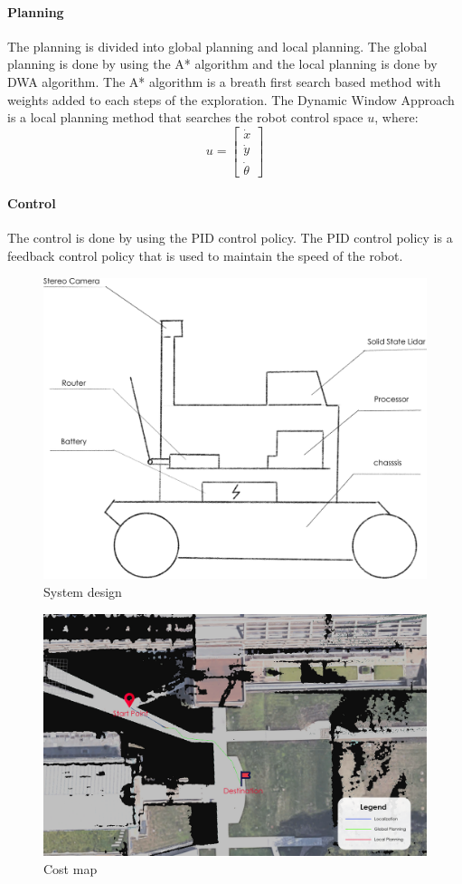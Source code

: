 \documentclass[balance,upint,subscriptcorrection,varvw,nofoot, mathalfa=cal=boondoxo,spanish,french,vietnamese,russian,greek,pdf-a,fontspec,colorlinks]{asmeconf}
\begin{document}
\paragraph{Planning} The planning is divided into global planning and local planning. The global planning is done by using the A* algorithm and the local planning is done by DWA algorithm. The A* algorithm is a breath first search based method with weights added to each steps of the exploration. The Dynamic Window Approach is a local planning method that searches the robot control space $u$, where:
\begin{equation}
	u=\left[\begin{array}{c}\dot{x}\\\dot{y}\\\dot{\theta}\end{array}\right]
\end{equation}
\paragraph{Control} The control is done by using the PID control policy. The PID control policy is a feedback control policy that is used to maintain the speed of the robot.


\begin{figure}
\centering\includegraphics[width=0.7\linewidth]{system.png}
\caption{System design}\label{sys}
\end{figure}

\begin{figure}
\centering\includegraphics[width=0.7\linewidth]{Planning_psed.png}
\caption{Cost map}\label{path_plan}
\end{figure}
\end{document}
